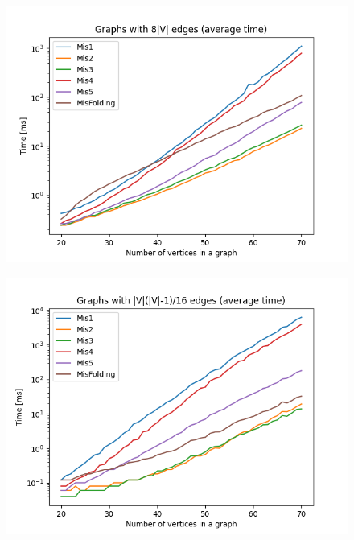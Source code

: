 \begin{figure}[H]
\includegraphics[width=\textwidth]{4_benchmark/plots/8n.png}
\centering
\end{figure}

\begin{figure}[H]
\includegraphics[width=\textwidth]{4_benchmark/plots/0.0625n2.png}
\centering
\end{figure}

